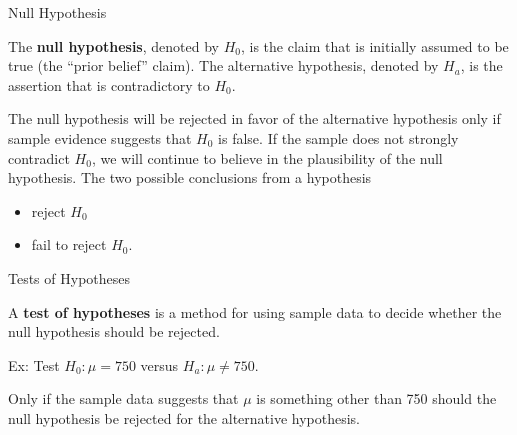 \documentclass[
  ignorenonframetext,
]{beamer}
\providecommand{\tightlist}{%
  \setlength{\itemsep}{0pt}\setlength{\parskip}{0pt}}\usepackage{longtable,booktabs,array}
\begin{document}
\begin{frame}{Null Hypothesis}
\protect\hypertarget{null-hypothesis}{}
\begin{tcolorbox}[enhanced jigsaw, left=2mm, breakable, bottomrule=.15mm, colframe=quarto-callout-important-color-frame, arc=.35mm, leftrule=.75mm, colbacktitle=quarto-callout-important-color!10!white, titlerule=0mm, opacityback=0, coltitle=black, opacitybacktitle=0.6, colback=white, toprule=.15mm, toptitle=1mm, bottomtitle=1mm, title=\textcolor{quarto-callout-important-color}{\faExclamation}\hspace{0.5em}{Definition}, rightrule=.15mm]

The \textbf{null hypothesis}, denoted by \(H_{0}\), is the claim that is
initially assumed to be true (the ``prior belief'' claim). The
alternative hypothesis, denoted by \(H_{a}\), is the assertion that is
contradictory to \(H_{0}\).

The null hypothesis will be rejected in favor of the alternative
hypothesis only if sample evidence suggests that \(H_{0}\) is false. If
the sample does not strongly contradict \(H_{0}\), we will continue to
believe in the plausibility of the null hypothesis. The two possible
conclusions from a hypothesis

\begin{itemize}[<+->]
\tightlist
\item
  reject \(H_{0}\)
\item
  fail to reject \(H_{0}\).
\end{itemize}

\end{tcolorbox}
\end{frame}

\begin{frame}{Tests of Hypotheses}
\protect\hypertarget{tests-of-hypotheses}{}
\begin{tcolorbox}[enhanced jigsaw, left=2mm, breakable, bottomrule=.15mm, colframe=quarto-callout-important-color-frame, arc=.35mm, leftrule=.75mm, colbacktitle=quarto-callout-important-color!10!white, titlerule=0mm, opacityback=0, coltitle=black, opacitybacktitle=0.6, colback=white, toprule=.15mm, toptitle=1mm, bottomtitle=1mm, title=\textcolor{quarto-callout-important-color}{\faExclamation}\hspace{0.5em}{Definition}, rightrule=.15mm]

A \textbf{test of hypotheses} is a method for using sample data to
decide whether the null hypothesis should be rejected.

Ex: Test \(H_{0}: \mu = 750\) versus \(H_{a}: \mu \neq 750\).

Only if the sample data suggests that \(\mu\) is something other than
750 should the null hypothesis be rejected for the alternative
hypothesis.

\end{tcolorbox}
\end{frame}
\end{document}
